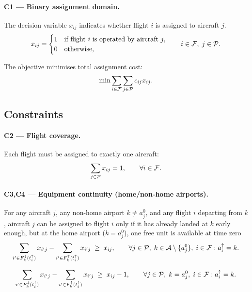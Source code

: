 \paragraph{C1 — Binary assignment domain.}
The decision variable $x_{ij}$ indicates whether flight $i$ is assigned to aircraft $j$.
\begin{equation}\label{eq:c0}
  x_{ij} = \begin{cases} 1 & \text{if flight } i \text{ is operated by aircraft } j, \\ 0 & \text{otherwise,} \end{cases}
  \qquad i \in \mathcal{F},\; j \in \mathcal{P}.
\end{equation}

The objective minimises total assignment cost:
\begin{equation}\label{eq:obj}
  \min \sum_{i \in \mathcal{F}} \sum_{j \in \mathcal{P}} c_{ij} x_{ij}.
\end{equation}

\subsection{Constraints}

\paragraph{C2 — Flight coverage.}
Each flight must be assigned to exactly one aircraft:
\begin{equation}\label{eq:c1}
  \sum_{j \in \mathcal{P}} x_{ij} = 1, \qquad \forall i \in \mathcal{F}.
\end{equation}

\paragraph{C3,C4 — Equipment continuity (home/non-home airports).}
For any aircraft $j$, any non-home airport $k \ne a^0_j$, and any flight
$i$ departing from $k$, aircraft $j$ can be assigned to flight $i$ only if
it has already landed at $k$ early enough,
but at the home airport ($k = a^0_j$), one free unit is available at time zero
\begin{equation}\label{eq:c2}
  \sum_{i' \in F^{\downarrow}_{k}(t^{\uparrow}_{i})} x_{i'j}
  - \sum_{i' \in F^{\uparrow}_{k}(t^{\uparrow}_{i})} x_{i'j}
  \;\geq\; x_{ij},
  \qquad \forall j \in \mathcal{P},\; k \in \mathcal{A} \setminus \{a^0_j\},\;
  i \in \mathcal{F} : a^{\uparrow}_{i}=k.
\end{equation}

\begin{equation}\label{eq:c3}
  \sum_{i' \in F^{\downarrow}_{k}(t^{\uparrow}_{i})} x_{i'j}
  - \sum_{i' \in F^{\uparrow}_{k}(t^{\uparrow}_{i})} x_{i'j}
  \;\geq\; x_{ij}-1,
  \qquad \forall j \in \mathcal{P},\; k = a^0_j,\;
  i \in \mathcal{F} : a^{\uparrow}_{i}=k.
\end{equation}

